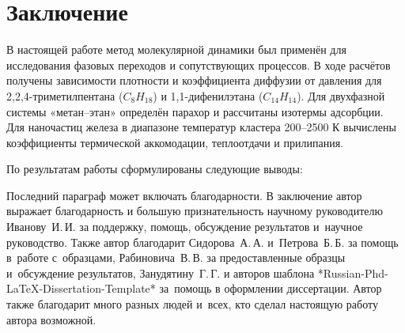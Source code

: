 \chapter*{Заключение}                       %


В настоящей работе метод молекулярной динамики был применён для исследования фазовых переходов и сопутствующих процессов. В ходе расчётов получены зависимости плотности и коэффициента диффузии от давления для 2,2,4-триметилпентана ($C_8H_{18}$) и 1,1-дифенилэтана ($C_{14}H_{14}$). Для двухфазной системы «метан–этан» определён парахор и рассчитаны изотермы адсорбции. Для наночастиц железа в диапазоне температур кластера 200–2500 К вычислены коэффициенты термической аккомодации, теплоотдачи и прилипания.

По результатам работы сформулированы следующие выводы:



Последний параграф может включать благодарности.  В заключение автор
выражает благодарность и большую признательность научному руководителю
Иванову~И.\,И. за поддержку, помощь, обсуждение результатов и~научное
руководство. Также автор благодарит Сидорова~А.\,А. и~Петрова~Б.\,Б.
за помощь в~работе с~образцами, Рабиновича~В.\,В. за предоставленные
образцы и~обсуждение результатов, Занудятину~Г.\,Г. и авторов шаблона
*Russian-Phd-LaTeX-Dissertation-Template* за~помощь в оформлении
диссертации. Автор также благодарит много разных людей
и~всех, кто сделал настоящую работу автора возможной.
